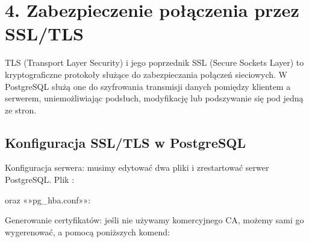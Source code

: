 \documentclass[a4paper,11pt,polish]{sphinxmanual}
\begin{document}
\section{4. Zabezpieczenie połączenia przez SSL/TLS}
\label{\detokenize{Bezpieczenstwo/index:zabezpieczenie-polaczenia-przez-ssl-tls}}
\sphinxAtStartPar
TLS (Transport Layer Security) i jego poprzednik SSL (Secure Sockets Layer) to kryptograficzne protokoły służące do zabezpieczania połączeń sieciowych. W PostgreSQL służą one do szyfrowania transmisji danych pomiędzy klientem a serwerem, uniemożliwiając podsłuch, modyfikację lub podszywanie się pod jedną ze stron.


\subsection{Konfiguracja SSL/TLS w PostgreSQL}
\label{\detokenize{Bezpieczenstwo/index:konfiguracja-ssl-tls-w-postgresql}}
\sphinxAtStartPar
Konfiguracja serwera: musimy edytować dwa pliki i zrestartować serwer PostgreSQL. Plik :

\begin{sphinxVerbatim}[commandchars=\\\{\}]
  
  
  
  
  
\end{sphinxVerbatim}

\sphinxAtStartPar
oraz «»pg\_hba.conf»»:

\begin{sphinxVerbatim}[commandchars=\\\{\}]
    
\end{sphinxVerbatim}

\sphinxAtStartPar
Generowanie certyfikatów: jeśli nie używamy komercyjnego CA, możemy sami go wygerenować, a pomocą poniższych komend:

\begin{sphinxVerbatim}[commandchars=\\\{\}]
    
      
          
\end{sphinxVerbatim}
\end{document}
